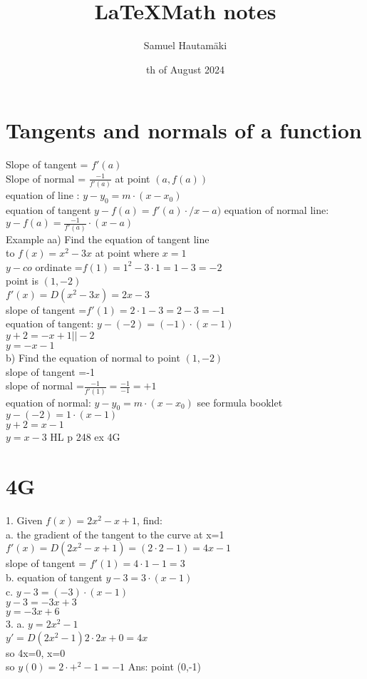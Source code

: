 \documentclass{article}
\title{\LaTeX Math notes}
\author{Samuel Hautamäki}
\date{th of August 2024}
\begin{document}
  \maketitle
   
  \section{Tangents and normals of a function}
  Slope of tangent = $f'(a)$\\
  Slope of normal = $\frac{-1}{f'(a)}$ at point $(a,f(a))$\\
  equation of line : $y-y_0 =m\cdot(x-x_0)$\\
  equation of tangent $y-f(a)=f'(a)\cdot/x-a)$
  equation of normal line:\\
  $y-f(a)=\frac{-1}{f'(a)}\cdot(x-a)$\\
  Example aa) Find the equation of tangent line\\
  to $f(x)=x^2-3x$ at point where $x=1$\\
  $y-co$ ordinate =$f(1)=1^2-3\cdot1=1-3=-2$\\
  point is $(1,-2)$\\
  $f'(x)=D (x^2-3x)=2x-3$\\
  slope of tangent =$f'(1)=2\cdot1-3=2-3=-1$\\
  equation of tangent: $y-(-2)=(-1)\cdot(x-1)$\\
  $y+2=-x+1  ||-2$\\
  $y=-x-1$\\
  b) Find the equation of normal to point $(1,-2)$\\
  slope of tangent =-1\\
  slope of normal =$\frac{-1}{f'(1)}=\frac{-1}{-1}=+1$\\
  equation of normal: $y-y_0=m\cdot(x-x_0)$ see formula booklet\\
  $y-(-2)=1\cdot(x-1)$\\
  $y+2=x-1$\\
  $y=x-3$
  HL p 248 ex 4G\\
  \section{4G}
  1. Given $f(x)=2x^2-x+1$, find:\\
  a. the gradient of the tangent to the curve at x=1\\
  $f'(x)=D (2x^2-x+1)=(2\cdot2-1)=4x-1$\\
  slope of tangent = $f'(1)=4\cdot1-1=3$\\
  b. equation of tangent $y-3=3\cdot(x-1)$\\
  c. $y-3=(-3)\cdot(x-1)$\\
  $y-3=-3x+3$\\
  $y=-3x+6$\\
  3. 
  a. $y=2x^2-1$\\
  $y' = D(2x^2-1)2\cdot2x+0=4x$\\
  so 4x=0, x=0\\
  so $y(0)=2\cdot+^2-1=-1$ Ans: point (0,-1)\\


   
\end{document}
